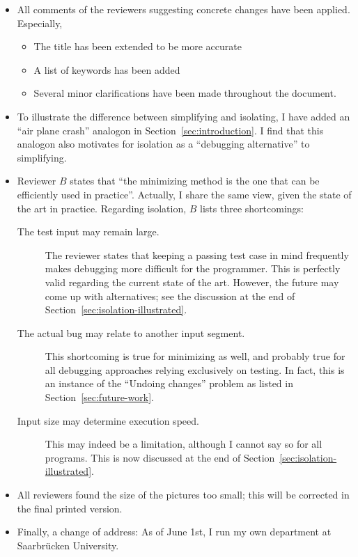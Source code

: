 \documentclass{acm_proc_article-sp}
\theoremstyle{plain}
\begin{document}
\begin{itemize}
\item All comments of the reviewers suggesting concrete changes have
  been applied.  Especially,
  \begin{itemize}
  \item The title has been extended to be more accurate
  \item A list of keywords has been added
  \item Several minor clarifications have been made throughout the document.
  \end{itemize}
  
\item To illustrate the difference between simplifying and isolating,
  I have added an ``air plane crash'' analogon in
  Section~\ref{sec:introduction}.  I find that this analogon also
  motivates for isolation as a ``debugging alternative'' to
  simplifying.
  
\item Reviewer $B$ states that ``the minimizing method is the one that
  can be efficiently used in practice''.  Actually, I share the same
  view, given the state of the art in practice.  Regarding isolation,
  $B$ lists three shortcomings:
  \begin{description}
  \item[The test input may remain large.]  The reviewer states that
    keeping a passing test case in mind frequently makes debugging
    more difficult for the programmer.  This is perfectly valid
    regarding the current state of the art.  However, the future may
    come up with alternatives; see the discussion at the end of
    Section~\ref{sec:isolation-illustrated}.
    
  \item[The actual bug may relate to another input segment.]  This
    shortcoming is true for minimizing as well, and probably true for
    all debugging approaches relying exclusively on testing.  In fact,
    this is an instance of the ``Undoing changes'' problem as listed
    in Section~\ref{sec:future-work}.
    
  \item[Input size may determine execution speed.]  This may indeed be
    a limitation, although I cannot say so for all programs.  This is
    now discussed at the end of
    Section~\ref{sec:isolation-illustrated}.
  \end{description}
  
  
\item All reviewers found the size of the pictures too small; this
  will be corrected in the final printed version.
  
\item Finally, a change of address: As of June 1st, I run my own department at
  Saarbr{\"u}cken University.
\end{itemize}
\end{document}
